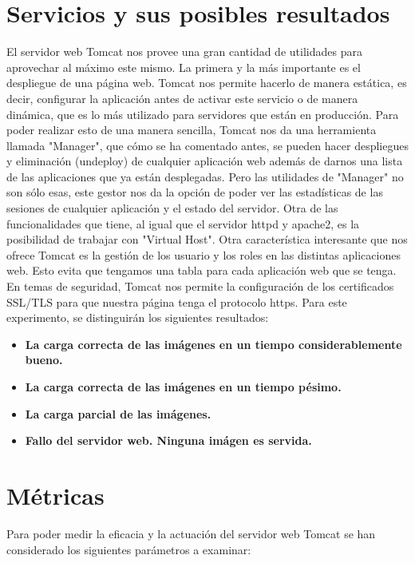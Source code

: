 \documentclass[11pt,twoside,a4paper]{book}
\begin{document}
\section{Servicios y sus posibles resultados}
El servidor web Tomcat nos provee una gran cantidad de utilidades para aprovechar al máximo este mismo. La primera y la más importante es el despliegue de una página web. Tomcat nos permite hacerlo de manera estática, es decir, configurar la aplicación antes de activar este servicio o de manera dinámica, que es lo más utilizado para servidores que están en producción.
\newline
Para poder realizar esto de una manera sencilla, Tomcat nos da una herramienta llamada "Manager", que cómo se ha comentado antes, se pueden hacer despliegues y eliminación (undeploy) de cualquier aplicación web además de darnos una lista de las aplicaciones que ya están desplegadas.
\newline
Pero las utilidades de "Manager" no son sólo esas, este gestor nos da la opción de poder ver las estadísticas de las sesiones de cualquier aplicación y el estado del servidor. Otra de las funcionalidades que tiene, al igual que el servidor httpd y apache2, es la posibilidad de trabajar con "Virtual Host".
\newline
Otra característica interesante que nos ofrece Tomcat es la gestión de los usuario y los roles en las distintas aplicaciones web. Esto evita que tengamos una tabla para cada aplicación web que se tenga. En temas de seguridad, Tomcat nos permite la configuración de los certificados SSL/TLS para que nuestra página tenga el protocolo https.
\newline
Para este experimento, se distinguirán los siguientes resultados:

\begin{itemize}
  \item \textbf{La carga correcta de las imágenes en un tiempo considerablemente bueno.}
  \item \textbf{La carga correcta de las imágenes en un tiempo pésimo.}
  \item \textbf{La carga parcial de las imágenes.}
  \item \textbf{Fallo del servidor web. Ninguna imágen es servida.}
\end{itemize}


\section{Métricas}
Para poder medir la eficacia y la actuación del servidor web Tomcat se han considerado los siguientes parámetros a examinar:
\end{document}
